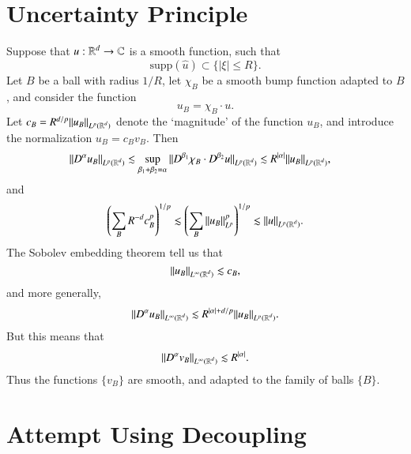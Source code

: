 \chapter{Uncertainty Principle}

Suppose that $u: \operatorname{\mathbb{R}}^d \to \operatorname{\mathbb{C}}$ is a smooth function, such that
%
\[ \text{supp} \left( \widehat{u} \right) \subset \{ |\xi| \leq R \}. \]
%
Let $B$ be a ball with radius $1/R$, let $\chi_B$ be a smooth bump function adapted to $B$, and consider the function
%
\[ u_B = \chi_B \cdot u. \]
%
Let $c_B = R^{d/p} \| u_B \|_{L^p(\operatorname{\mathbb{R}}^d)}$ denote the `magnitude' of the function $u_B$, and introduce the normalization $u_B = c_B v_B$. Then
%
\begin{align*}
    \| D^\alpha u_B \|_{L^p(\operatorname{\mathbb{R}}^d)} &\lesssim \sup_{\beta_1 + \beta_2 = \alpha} \| D^{\beta_1} \chi_B \cdot D^{\beta_2} u \|_{L^p(\operatorname{\mathbb{R}}^d)} \lesssim R^{|\alpha|} \| u_B \|_{L^p(\operatorname{\mathbb{R}}^d)},
\end{align*}
%
and
%
\[ \left( \sum_B R^{-d} c_B^p \right)^{1/p} \lesssim \left( \sum_B \| u_B \|_{L^p}^p \right)^{1/p} \lesssim \| u \|_{L^p(\operatorname{\mathbb{R}}^d)}. \]
%
The Sobolev embedding theorem tell us that
%
\[ \| u_B \|_{L^\infty(\operatorname{\mathbb{R}}^d)} \lesssim c_B, \]
%
and more generally,
%
\[ \| D^\alpha u_B \|_{L^\infty(\operatorname{\mathbb{R}}^d)} \lesssim R^{|\alpha| + d/p} \| u_B \|_{L^p(\operatorname{\mathbb{R}}^d)}. \]
%
But this means that
%
\[ \| D^\alpha v_B \|_{L^\infty(\operatorname{\mathbb{R}}^d)} \lesssim R^{|\alpha|}. \]
%
Thus the functions $\{ v_B \}$ are smooth, and adapted to the family of balls $\{ B \}$.







\chapter{Attempt Using Decoupling}

